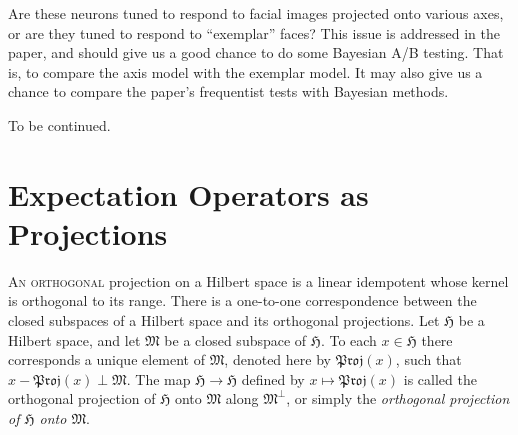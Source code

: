 \documentclass[
twoside=true,
paper=letter,
fontsize=9pt,
pagesize=auto,
leqno,
openany,
headsepline,
overfullrule,
]{scrbook}
\theoremstyle{plain}
\theoremstyle{plain}
\theoremstyle{definition}
\theoremstyle{bfnoteitalic}
\theoremstyle{bfnoteroman}
\begin{document}
Are these neurons tuned to respond to facial images projected onto various axes, or are they tuned to respond to ``exemplar'' faces? This issue is addressed in the paper, and should give us a good chance to do some Bayesian A/B testing.  That is, to compare the axis model with the exemplar model. It may also give us a chance to compare the paper's frequentist tests with Bayesian methods.

To be continued.





\chapter{Expectation Operators as Projections}
%
\newcommand{\proj}{\mathfrak{Proj}}
\newcommand{\projsub}[1]{\mathop{\proj\kern-1pt}\nolimits_#1}
\newcommand{\projgvn}[2]
{\mathop{\proj}\nolimits(#2,#1)}
\newcommand{\raum}[1]{\mathfrak{#1}}
\newcommand{\inner}[2]{\left\langle#1,#2\right\rangle}
\newcommand{\hilbertspace}{\mathfrak{H}}
\newcommand{\hilbertsubspace}{\mathfrak{M}}
\newcommand{\hilbertelt}{x}
\newcommand{\hilberteltii}{y}
\newcommand{\hilbertortho}{e_1}
\newcommand{\hilbertorthoii}{e_2}
\newcommand{\hilbertorthoi}{e_i}
\newcommand{\hilbertorthon}{e_n}

\lettrine{A}{n orthogonal} projection on a Hilbert space is a linear idempotent whose kernel is orthogonal to its range.
There is a one-to-one correspondence between the closed subspaces of a Hilbert space and its orthogonal projections.
Let $\hilbertspace$ be a Hilbert space, and let $\hilbertsubspace$ be a closed subspace of $\hilbertspace$. To each $\hilbertelt\in\hilbertspace$ there corresponds a unique element of $\hilbertsubspace$, denoted here by
$\proj(\hilbertelt)$,  such that 
$\hilbertelt-\proj(\hilbertelt) \perp \hilbertsubspace$.
The map $\hilbertspace \to \hilbertspace$ defined by 
$\hilbertelt\mapsto \proj(\hilbertelt)$ is called the orthogonal projection of 
$\hilbertspace$ onto $\hilbertsubspace$ along ${\hilbertsubspace}^\perp$, or simply the
\emph{orthogonal projection of $\boldsymbol{\hilbertspace}$ 
onto $\boldsymbol{\hilbertsubspace}$}.
\end{document}
